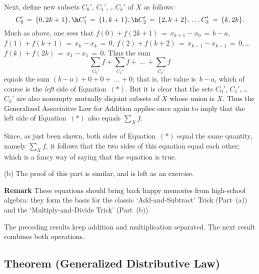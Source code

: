 {        Next, define new subsets $C_{0}'$, $C_{1}'$,\,{\ldots}\,$C_{k}'$ of $X$ as follows:
        \begin{displaymath}
        C_{0}' \,=\, \{0,2k+1\}, \h C_{1}' \,=\, \{1,k+1\}, \h C_{2}' \,=\, \{2,k+2\},\,{\ldots}\,C_{k}' \,=\, \{k,2k\}.
        \end{displaymath}
    Much as above, one sees that $f(0)+f(2k+1) \,=\, x_{k+1} - x_{0} \,=\, b-a$, $f(1)+f(k+1) \,=\, x_{k}-x_{k} \,=\, 0$, $f(2)+f(k+2) \,=\, x_{k-1}-x_{k-1} \,=\, 0$,\,{\ldots}\,$f(k)+f(2k) \,=\, x_{1}-x_{1} \,=\, 0$.
    Thus the sum
        \begin{displaymath}
        {\sum}_{C_{0}'} f + {\sum}_{C_{1}'} f + \,{\ldots}\,+{\sum}_{C_{k}'} f 
        \end{displaymath}
    equals the sum $(b-a) + 0 + 0 + \,{\ldots}\,+ 0$; that is, the value is~$b-a$, which of course is the {\em left} side of  Equation~$({\ast})$.
    But it is clear that the sets $C_{0}'$, $C_{1}'$,\,{\ldots}\, $C_{k}'$ are also nonempty mutually disjoint subsets of $X$ whose union is $X$.
    Thus the Generalized Associative Law for Addition applies once again to imply that the left side of Equation~$({\ast})$ also equals ${\sum}_{X} f$.


        Since, as just been shown, both sides of Equation~$({\ast})$ equal the same quantity, namely ${\sum}_{X} f$,
    it follows that the two sides of this equation equal each other; which is a fancy way of saying that the equation is true.

\V

        (b) The proof of this part is similar, and is left as an exercise.


\V
\V

        {\bf Remark} These equations should bring back happy memories from high-school algebra:
    they form the basis for the classic `Add-and-Subtract' Trick (Part~(a)) and the `Multiply-and-Divide Trick' (Part~(b)).

\V
\V


        The preceding results keep addition and multiplication separated. The next result combines both operations.

\V

            \subsection{\small{\bf Theorem} (Generalized Distributive Law)}
            \label{ThmB10.110}

\V

}
